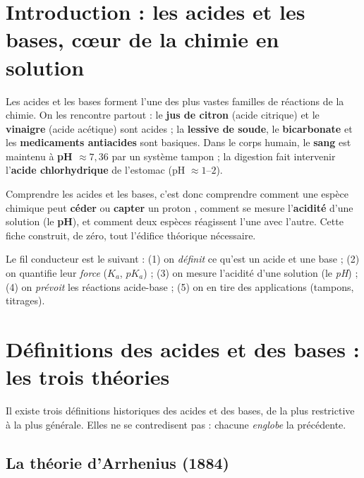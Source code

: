 \documentclass[11pt,a4paper]{article}
\begin{document}
\section{Introduction : les acides et les bases, cœur de la chimie en solution}
Les acides et les bases forment l'une des plus vastes familles de réactions de la chimie. On les rencontre
partout : le \textbf{jus de citron} (acide citrique) et le \textbf{vinaigre} (acide acétique) sont acides ; la
\textbf{lessive de soude}, le \textbf{bicarbonate} et les \textbf{medicaments antiacides} sont basiques. Dans le
corps humain, le \textbf{sang} est maintenu à \textbf{pH $\approx 7,36$} par un système tampon ; la digestion
fait intervenir l'\textbf{acide chlorhydrique} de l'estomac (pH $\approx 1\text{--}2$).

Comprendre les acides et les bases, c'est donc comprendre comment une espèce chimique peut \textbf{céder} ou
\textbf{capter} un proton , comment se mesure l'\textbf{acidité} d'une solution (le \textbf{pH}), et
comment deux espèces réagissent l'une avec l'autre. Cette fiche construit, de zéro, tout l'édifice
théorique nécessaire.

\begin{methode}
Le fil conducteur est le suivant : (1) on \emph{définit} ce qu'est un acide et une base ; (2) on quantifie
leur \emph{force} ($K_a$, $pK_a$) ; (3) on mesure l'acidité d'une solution (le \emph{pH}) ; (4) on
\emph{prévoit} les réactions acide-base ; (5) on en tire des applications (tampons, titrages).
\end{methode}

\section{Définitions des acides et des bases : les trois théories}
Il existe trois définitions historiques des acides et des bases, de la plus restrictive à la plus générale.
Elles ne se contredisent pas : chacune \emph{englobe} la précédente.

\subsection{La théorie d'Arrhenius (1884)}
\end{document}
